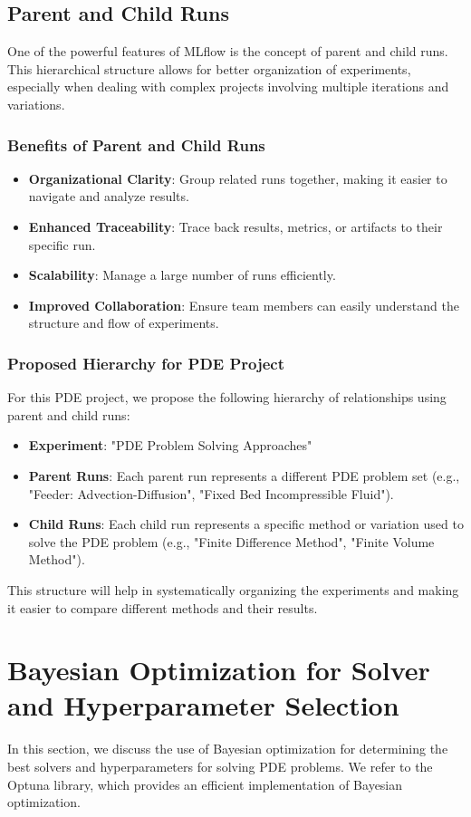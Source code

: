 \documentclass{article}
\begin{document}
\subsection{Parent and Child Runs}
One of the powerful features of MLflow is the concept of parent and child runs. This hierarchical structure allows for better organization of experiments, especially when dealing with complex projects involving multiple iterations and variations.

\subsubsection{Benefits of Parent and Child Runs}
\begin{itemize}
    \item \textbf{Organizational Clarity}: Group related runs together, making it easier to navigate and analyze results.
    \item \textbf{Enhanced Traceability}: Trace back results, metrics, or artifacts to their specific run.
    \item \textbf{Scalability}: Manage a large number of runs efficiently.
    \item \textbf{Improved Collaboration}: Ensure team members can easily understand the structure and flow of experiments.
\end{itemize}

\subsubsection{Proposed Hierarchy for PDE Project}
For this PDE project, we propose the following hierarchy of relationships using parent and child runs:
\begin{itemize}
    \item \textbf{Experiment}: "PDE Problem Solving Approaches"
    \item \textbf{Parent Runs}: Each parent run represents a different PDE problem set (e.g., "Feeder: Advection-Diffusion", "Fixed Bed Incompressible Fluid").
    \item \textbf{Child Runs}: Each child run represents a specific method or variation used to solve the PDE problem (e.g., "Finite Difference Method", "Finite Volume Method").
\end{itemize}

This structure will help in systematically organizing the experiments and making it easier to compare different methods and their results.

\section{Bayesian Optimization for Solver and Hyperparameter Selection}
In this section, we discuss the use of Bayesian optimization for determining the best solvers and hyperparameters for solving PDE problems. We refer to the Optuna library, which provides an efficient implementation of Bayesian optimization.
\end{document}
